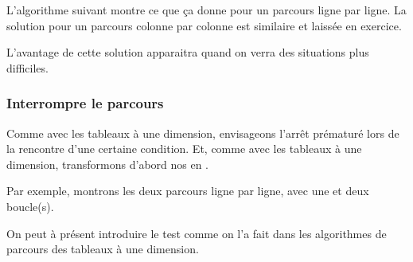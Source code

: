 L'algorithme suivant montre ce que ça donne
pour un parcours ligne par ligne.
La solution pour un parcours colonne par colonne est similaire
et laissée en exercice.


L'avantage de cette solution apparaitra 
quand on verra des situations plus difficiles.

\subsubsection*{Interrompre le parcours}

Comme avec les tableaux à une dimension, 
envisageons l'arrêt prématuré lors de la rencontre d'une certaine condition.
Et, comme avec les tableaux à une dimension, 
transformons d'abord nos  en .

Par exemple, montrons les deux parcours ligne par ligne, avec une et deux boucle(s).



On peut à présent introduire le test comme on l'a fait 
dans les algorithmes de parcours des tableaux à une dimension.

